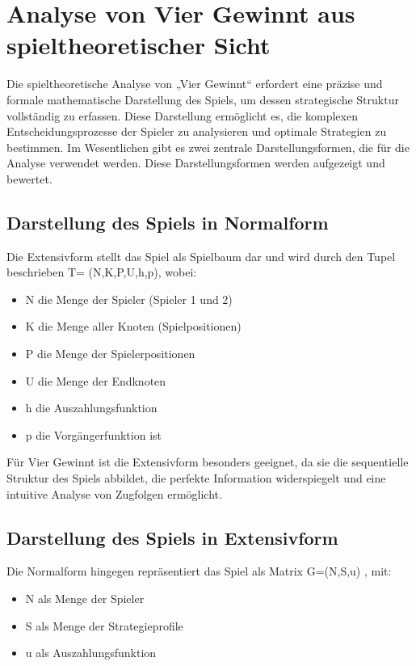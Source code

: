 \chapter{Analyse von Vier Gewinnt aus spieltheoretischer Sicht}

Die spieltheoretische Analyse von „Vier Gewinnt“ erfordert eine präzise und formale mathematische Darstellung des Spiels, um dessen strategische Struktur vollständig zu erfassen. Diese Darstellung ermöglicht es, die komplexen Entscheidungsprozesse der Spieler zu analysieren und optimale Strategien zu bestimmen. Im Wesentlichen gibt es zwei zentrale Darstellungsformen, die für die Analyse verwendet werden. Diese Darstellungsformen werden aufgezeigt und bewertet.

\section{Darstellung des Spiels in Normalform}

Die Extensivform stellt das Spiel als Spielbaum dar und wird durch den Tupel  beschrieben T= (N,K,P,U,h,p), wobei:
\begin{itemize}
	\item N die Menge der Spieler (Spieler 1 und 2)
	\item K die Menge aller Knoten (Spielpositionen)
	\item P die Menge der Spielerpositionen
	\item U die Menge der Endknoten
	\item h die Auszahlungsfunktion
	\item p die Vorgängerfunktion ist
\end{itemize}
Für Vier Gewinnt ist die Extensivform besonders geeignet, da sie die sequentielle Struktur des Spiels abbildet, die perfekte Information widerspiegelt und eine intuitive Analyse von Zugfolgen ermöglicht.

 \section{Darstellung des Spiels in Extensivform}
Die Normalform hingegen repräsentiert das Spiel als Matrix G=(N,S,u) , mit:
\begin{itemize}
	\item N als Menge der Spieler
	\item S als Menge der Strategieprofile
	\item u als Auszahlungsfunktion
\end{itemize}

